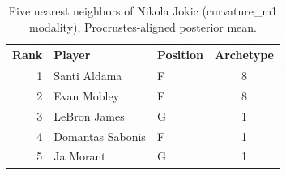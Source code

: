 \begin{table}[htbp]
  \centering\small
  \begin{tabular}{rllc}
    \toprule
    Rank & Player & Position & Archetype \\
    \midrule
    1 & Santi Aldama & F & 8 \\
    2 & Evan Mobley & F & 8 \\
    3 & LeBron James & G & 1 \\
    4 & Domantas Sabonis & F & 1 \\
    5 & Ja Morant & G & 1 \\
    \bottomrule
  \end{tabular}
  \caption{Five nearest neighbors of Nikola Jokic (curvature_m1 modality), Procrustes-aligned posterior mean.}
  \label{tab:Nikola_Jokic_neighbors_curvature_m1}
\end{table}

